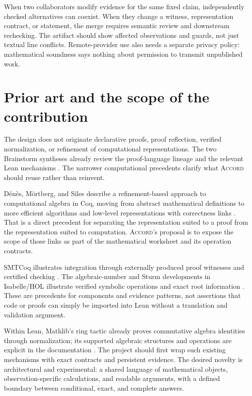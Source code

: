 \documentclass[11pt,a4paper]{article}
\newcommand{\Accord}{\textsc{Accord}}
\theoremstyle{definition}
\begin{document}
When two collaborators modify evidence for the same fixed claim, independently
checked alternatives can coexist. When they change a witness, representation
contract, or statement, the merge requires semantic review and downstream
rechecking. The artifact should show affected observations and guards, not just
textual line conflicts. Remote-provider use also needs a separate privacy policy:
mathematical soundness says nothing about permission to transmit unpublished work.

\section{Prior art and the scope of the contribution}
\label{sec:prior}
The design does not originate declarative proofs, proof reflection, verified
normalization, or refinement of computational representations. The two Brainstorm
syntheses already review the proof-language lineage and the relevant Lean
mechanisms \cite{syn-a,syn-b}. The narrower computational precedents clarify
what \Accord{} should reuse rather than reinvent.

D\'en\`es, M\"ortberg, and Siles describe a refinement-based approach to
computational algebra in Coq, moving from abstract mathematical definitions to
more efficient algorithms and low-level representations with correctness links
\cite{coqeal}. That is a direct precedent for separating the representation
suited to a proof from the representation suited to computation. \Accord{}'s
proposal is to expose the scope of those links as part of the mathematical
worksheet and its operation contracts.

SMTCoq illustrates integration through externally produced proof witnesses and
certified checking \cite{smtcoq}. The algebraic-number and Sturm developments in
Isabelle/HOL illustrate verified symbolic operations and exact root information
\cite{afp-algebraic,afp-sturm}. These are precedents for components and evidence
patterns, not assertions that code or proofs can simply be imported into Lean
without a translation and validation argument.

Within Lean, Mathlib's ring tactic already proves commutative algebra identities
through normalization; its supported algebraic structures and operations are
explicit in the documentation \cite{mathlib-ring}. The project should first
wrap such existing mechanisms with exact contracts and persistent evidence.
The desired novelty is architectural and experimental: a shared language of
mathematical objects, observation-specific calculations, and readable arguments,
with a defined boundary between conditional, exact, and complete answers.
\end{document}
